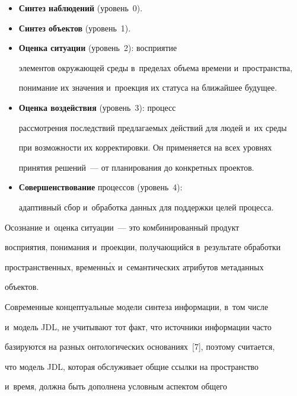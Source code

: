   \begin{itemize}


\item \textbf{Синтез наблюдений} (уровень~0).


\item \textbf{Синтез объектов} (уровень~1).


\item \textbf{Оценка ситуации} (уровень~2): восприятие 


элементов окру\-жа\-ющей среды в~пределах объема времени и~пространства, 


понимание их значения и~проекция их статуса на ближайшее будущее. 


\item \textbf{Оценка воздействия} (уровень~3): процесс 


рассмотрения последствий пред\-ла\-га\-емых действий для людей и~их среды 


при воз\-мож\-ности их корректировки. Он применяется на всех уровнях 


принятия решений~--- от планирования до конкретных проектов. 


\item \textbf{Совершенствование} процессов (уровень~4): 


адап\-тив\-ный сбор и~обработка данных для под\-держ\-ки целей процесса. 


\end{itemize}





  Осознание и~оценка ситуации~--- это комбинированный продукт 


восприятия, понимания и~проекции, по\-лу\-ча\-ющий\-ся в~результате обработки 


про\-стран\-ст\-вен\-ных, временн\'{ы}х и~семантических атрибутов метаданных 


объектов.


  


  Современные концептуальные модели синтеза информации, в~том чис\-ле 


и~модель JDL, не учитывают тот факт, что источники информации час\-то 


базируются на раз\-ных онтологических основаниях~[7], поэтому считается, 


что модель JDL, которая обслуживает общие ссылки на пространство 


и~время, должна быть дополнена условным аспектом общего 


